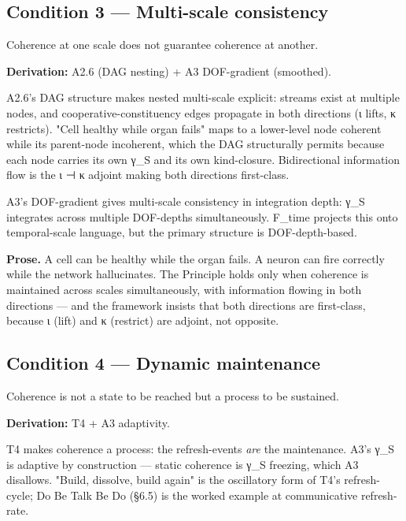 \documentclass[11pt, openany]{book}
\renewenvironment{quote}{\begin{quoting}}{\end{quoting}}
\begin{document}
\subsection{Condition 3 --- Multi-scale consistency}

\begin{quote}
Coherence at one scale does not guarantee coherence at another.
\end{quote}

\textbf{Derivation:} A2.6 (DAG nesting) + A3 DOF-gradient (smoothed).

A2.6's DAG structure makes nested multi-scale explicit: streams exist at multiple nodes, and cooperative-constituency edges propagate in both directions (ι lifts, κ restricts). "Cell healthy while organ fails" maps to a lower-level node coherent while its parent-node incoherent, which the DAG structurally permits because each node carries its own γ\_\allowbreak{}S and its own kind-closure. Bidirectional information flow is the ι ⊣ κ adjoint making both directions first-class.

A3's DOF-gradient gives multi-scale consistency in integration depth: γ\_\allowbreak{}S integrates across multiple DOF-depths simultaneously. F\_\allowbreak{}time projects this onto temporal-scale language, but the primary structure is DOF-depth-based.

\textbf{Prose.} A cell can be healthy while the organ fails. A neuron can fire correctly while the network hallucinates. The Principle holds only when coherence is maintained across scales simultaneously, with information flowing in both directions --- and the framework insists that both directions are first-class, because ι (lift) and κ (restrict) are adjoint, not opposite.

\subsection{Condition 4 --- Dynamic maintenance}

\begin{quote}
Coherence is not a state to be reached but a process to be sustained.
\end{quote}

\textbf{Derivation:} T4 + A3 adaptivity.

T4 makes coherence a process: the refresh-events \textit{are} the maintenance. A3's γ\_\allowbreak{}S is adaptive by construction --- static coherence is γ\_\allowbreak{}S freezing, which A3 disallows. "Build, dissolve, build again" is the oscillatory form of T4's refresh-cycle; Do Be Talk Be Do (§6.5) is the worked example at communicative refresh-rate.
\end{document}
